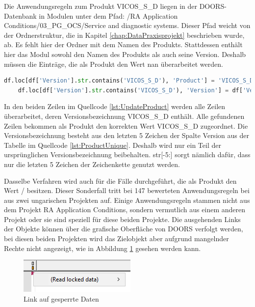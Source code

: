 Die Anwendungsregeln zum Produkt \glqq VICOS\_S\_D\grqq{} liegen in der \ac{DOORS}-Datenbank in Modulen unter dem Pfad: /RA Application Conditions/03\_PG\_OCS/Service and diagnostic systems.
Dieser Pfad weicht von der Ordnerstruktur, die in Kapitel \ref*{chap:DataPraxisprojekt} beschrieben wurde, ab. Es fehlt hier der Ordner mit dem Namen des Produkts.
Stattdessen enthält hier das Modul sowohl den Namen des Produkts als auch seine Version. Deshalb müssen die Einträge, die als Produkt den Wert \glqq nan\grqq{}
überarbeitet werden. 

\begin{lstlisting}[language = python, caption={Eintragen der korrekten Produkt- und Versionsbezeichnung},captionpos=b, label = lst:UpdateProduct, floatplacement=H]
    df.loc[df['Version'].str.contains('VICOS_S_D'), 'Product'] = 'VICOS_S_D'
    df.loc[df['Version'].str.contains('VICOS_S_D'), 'Version'] = df['Version'].str[-5:]  
\end{lstlisting}

In den beiden Zeilen im Quellcode \ref*{lst:UpdateProduct} werden alle Zeilen überarbeitet, deren Versionsbezeichnung \glqq VICOS\_S\_D\grqq{} enthält.
Alle gefundenen Zeilen bekommen als Produkt den korrekten Wert \glqq VICOS\_S\_D\grqq{} zugeordnet. Die Versionsbezeichnung besteht aus den letzten 5 Zeichen
der Spalte \glqq Version\grqq{} aus der Tabelle im Quellcode \ref*{lst:ProductUnique}. Deshalb wird nur ein Teil der ursprünglichen Versionsbezeichnung
beibehalten. str[-5:] sorgt nämlich dafür, dass nur die letzten 5 Zeichen der Zeichenkette genutzt werden.

Dasselbe Verfahren wird auch für die Fälle durchgeführt, die als Produkt den Wert \glqq /\grqq{} besitzen. Dieser Sonderfall tritt bei 147 bewerteten Anwendungsregeln
bei aus zwei ungarischen Projekten auf.
Einige Anwendungsregeln stammen nicht aus dem Projekt RA Application Conditions, sondern vermutlich aus einem anderen Projekt oder sie sind speziell 
für diese beiden Projekte. Die ausgehenden Links der Objekte können über die grafische Oberfläche von \ac{DOORS} verfolgt werden, bei diesen beiden Projekten
wird das Zielobjekt aber aufgrund mangelnder Rechte nicht angezeigt, wie in Abbildung \ref{fig:LockedData} gesehen werden kann. 

\begin{figure}[H]
    \centering
    \includegraphics[width = \textwidth/2]{abbildungen/LockedData.PNG}
    \caption{Link auf gesperrte Daten}
    \label{fig:LockedData}
\end{figure}

